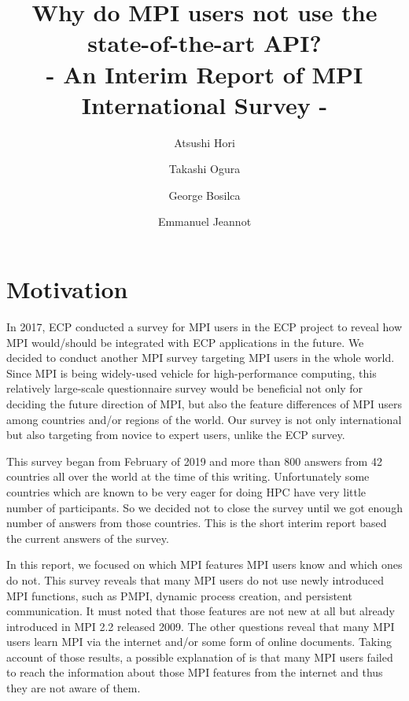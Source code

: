 \documentclass[sigconf,nonacm]{acmart}
\begin{document}
\title{Why do MPI users not use the state-of-the-art API?\\
- An Interim Report of MPI International Survey -}


\author{Atsushi Hori}
\author{Takashi Ogura}
 
\author{George Bosilca}
 
\author{Emmanuel Jeannot}

\maketitle

\section{Motivation}

In 2017, ECP\cite{ECP} conducted a survey for MPI users in the ECP
project to reveal how MPI would/should be integrated with ECP
applications in the future\cite{osti_1462877}.  
We decided to conduct another MPI survey targeting MPI users in the
whole world. Since MPI is being widely-used vehicle for
high-performance computing, this relatively large-scale questionnaire 
survey would be beneficial not only for deciding the future direction
of MPI, but also the feature differences of MPI users among
countries and/or regions of the world.  Our survey is not only
international but also targeting from novice to expert users, unlike
the ECP survey.

This survey began from February of 2019 and more than 800 answers from
42 countries all over the world at the time of this writing.
Unfortunately some countries which are known to be very eager for
doing HPC have very little number of participants. So we decided not
to close the survey until we got enough number of answers from those
countries. This is the short interim report based the current answers
of the survey. 

In this report, we focused on which MPI features MPI users
know and which ones do not. This survey reveals that many MPI
users do not use newly introduced MPI functions, such as PMPI, dynamic
process creation, and persistent communication. It must noted that
those features are not new at all but already introduced in MPI 2.2
released 2009. The other questions 
reveal that many MPI users learn MPI  via the internet and/or some form of
online documents. Taking account of those results, a possible explanation of
is that many MPI users failed to reach the information about those
MPI features from the internet and thus they are not aware of them.
\end{document}
